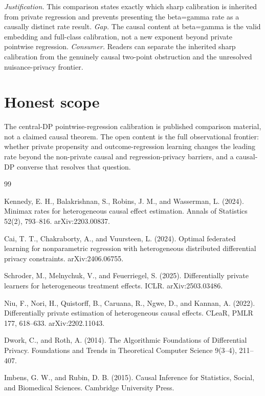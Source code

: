 \documentclass{article}
\begin{document}
\par\smallskip\noindent \textit{Justification.} This comparison states exactly which sharp calibration is inherited from private regression and prevents presenting the beta=gamma rate as a causally distinct rate result. \textit{Gap.} The causal content at beta=gamma is the valid embedding and full-class calibration, not a new exponent beyond private pointwise regression. \textit{Consumer.} Readers can separate the inherited sharp calibration from the genuinely causal two-point obstruction and the unresolved nuisance-privacy frontier.

\section{Honest scope}

The central-DP pointwise-regression calibration is published comparison material, not a claimed causal theorem. The open content is the full observational frontier: whether private propensity and outcome-regression learning changes the leading rate beyond the non-private causal and regression-privacy barriers, and a causal-DP converse that resolves that question.

\begin{thebibliography}{99}

   Kennedy, E. H., Balakrishnan, S., Robins, J. M., and Wasserman, L. (2024). Minimax rates for heterogeneous causal effect estimation. Annals of Statistics 52(2), 793--816. arXiv:2203.00837.

   Cai, T. T., Chakraborty, A., and Vuursteen, L. (2024). Optimal federated learning for nonparametric regression with heterogeneous distributed differential privacy constraints. arXiv:2406.06755.

   Schroder, M., Melnychuk, V., and Feuerriegel, S. (2025). Differentially private learners for heterogeneous treatment effects. ICLR. arXiv:2503.03486.

   Niu, F., Nori, H., Quistorff, B., Caruana, R., Ngwe, D., and Kannan, A. (2022). Differentially private estimation of heterogeneous causal effects. CLeaR, PMLR 177, 618--633. arXiv:2202.11043.

   Dwork, C., and Roth, A. (2014). The Algorithmic Foundations of Differential Privacy. Foundations and Trends in Theoretical Computer Science 9(3--4), 211--407.

   Imbens, G. W., and Rubin, D. B. (2015). Causal Inference for Statistics, Social, and Biomedical Sciences. Cambridge University Press.

\end{thebibliography}
\end{document}
